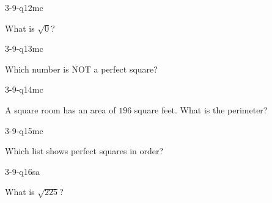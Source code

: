\begin{practiceQuestion}{3-9-q12}{mc}
\begin{questionText}
What is $\sqrt{0}$?
\end{questionText}
\end{practiceQuestion}

\begin{practiceQuestion}{3-9-q13}{mc}
\begin{questionText}
Which number is NOT a perfect square?
\end{questionText}
\end{practiceQuestion}

\begin{practiceQuestion}{3-9-q14}{mc}
\begin{questionText}
A square room has an area of $196$ square feet. What is the perimeter?
\end{questionText}
\end{practiceQuestion}

\begin{practiceQuestion}{3-9-q15}{mc}
\begin{questionText}
Which list shows perfect squares in order?
\end{questionText}
\end{practiceQuestion}


\begin{practiceQuestion}{3-9-q16}{sa}
\begin{questionText}
What is $\sqrt{225}$?
\end{questionText}
\end{practiceQuestion}

